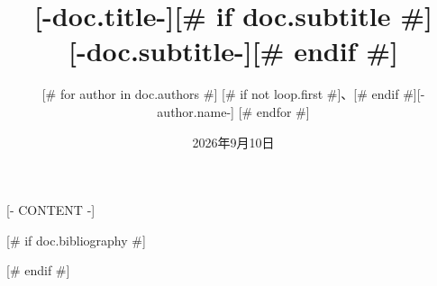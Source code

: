 \documentclass[UTF8,fontset=none,a4paper,11pt,oneside]{ctexbook}
\title{\Huge\bfseries [-doc.title-][# if doc.subtitle #]\\[0.8em]\Large [-doc.subtitle-][# endif #]}
\author{
[# for author in doc.authors #]
  [# if not loop.first #]、[# endif #][-author.name-]
[# endfor #]
}
\date{2026年9月10日}
\begin{document}
\sloppy

\frontmatter
\hypersetup{pageanchor=false}
\maketitle
\clearpage
\hypersetup{pageanchor=true}
\begingroup
\small
\tableofcontents
\endgroup

\mainmatter

[- CONTENT -]

[# if doc.bibliography #]

[# endif #]
\end{document}
